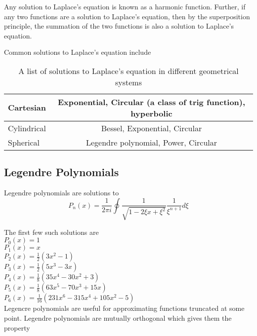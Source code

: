\documentclass{article}
\numberwithin{equation}{subsection}
\begin{document}
Any solution to Laplace's equation is known as a harmonic function. Further, if any two functions are a solution to Laplace's equation, then by the superposition principle, the summation of the two functions is also a solution to Laplace's equation.

Common solutions to Laplace's equation include

\begin{table}
\begin{center}
\label{tbl_laplace_solutions}
\caption{A list of solutions to Laplace's equation in different geometrical systems}
\begin{tabular}{|l|c|}
\hline
Cartesian & Exponential, Circular (a class of trig function), hyperbolic \\ \hline
Cylindrical & Bessel, Exponential, Circular \\ \hline
Spherical & Legendre polynomial, Power, Circular \\ \hline
\end{tabular}
\end{center}
\end{table}

\subsection{Legendre Polynomials} \label{sec_legendre}

Legendre polynomials are solutions to
\begin{equation}
P_n(x) = \frac{1}{2 \pi i} \oint \frac{1}{\sqrt{1-2\xi x + \xi^2}} \frac{1}{\xi^{n+1}} d\xi
\end{equation}



The first few such solutions are \\
$P_0(x) = 1$ \\
$P_1(x) = x$ \\
$P_2(x) = \frac{1}{2}(3x^2-1)$ \\
$P_3(x) = \frac{1}{2}(5x^3 - 3x)$ \\
$P_4(x) = \frac{1}{8}(35x^4 - 30x^2 + 3)$ \\
$P_5(x) = \frac{1}{8}(63x^5 - 70x^3 + 15x)$ \\
$P_6(x) = \frac{1}{16}(231x^6 - 315x^4 + 105x^2 - 5)$ \\

Legencre polynomials are useful for approximating functions truncated at some point. Legendre polynomials are mutually orthogonal which gives them the property
\end{document}
